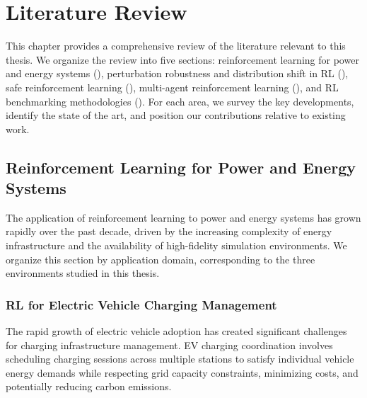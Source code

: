 \chapter{Literature Review}
\label{ch:literature}

This chapter provides a comprehensive review of the literature relevant to this thesis. We organize the review into five sections: reinforcement learning for power and energy systems (), perturbation robustness and distribution shift in RL (), safe reinforcement learning (), multi-agent reinforcement learning (), and RL benchmarking methodologies (). For each area, we survey the key developments, identify the state of the art, and position our contributions relative to existing work.

\section{Reinforcement Learning for Power and Energy Systems}
\label{sec:lit_rl_energy}

The application of reinforcement learning to power and energy systems has grown rapidly over the past decade, driven by the increasing complexity of energy infrastructure and the availability of high-fidelity simulation environments. We organize this section by application domain, corresponding to the three environments studied in this thesis.

\subsection{RL for Electric Vehicle Charging Management}

The rapid growth of electric vehicle adoption has created significant challenges for charging infrastructure management. EV charging coordination involves scheduling charging sessions across multiple stations to satisfy individual vehicle energy demands while respecting grid capacity constraints, minimizing costs, and potentially reducing carbon emissions.

